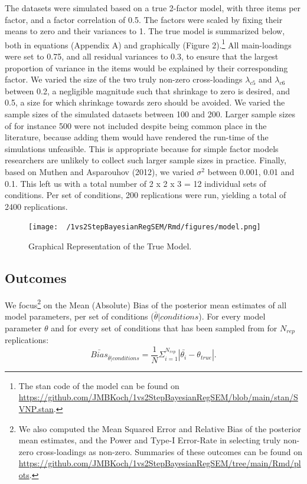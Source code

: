 \documentclass[
  man,floatsintext]{apa6}
\begin{document}
The datasets were simulated based on a true 2-factor model, with three items per factor, and a factor correlation of 0.5. The factors were scaled by fixing their means to zero and their variances to 1. The true model is summarized below, both in equations (Appendix A) and graphically (Figure 2).\footnote{The stan code of the model can be found on \url{https://github.com/JMBKoch/1vs2StepBayesianRegSEM/blob/main/stan/SVNP.stan}.} All main-loadings were set to 0.75, and all residual variances to 0.3, to ensure that the largest proportion of variance in the items would be explained by their corresponding factor. We varied the size of the two truly non-zero cross-loadings \(\lambda_{c 5}\) and \(\lambda_{c 6}\) between 0.2, a negligible magnitude such that shrinkage to zero is desired, and 0.5, a size for which shrinkage towards zero should be avoided. We varied the sample sizes of the simulated datasets between 100 and 200. Larger sample sizes of for instance 500 were not included despite being common place in the literature, because adding them would have rendered the run-time of the simulations unfeasible. This is appropriate because for simple factor models researchers are unlikely to collect such larger sample sizes in practice. Finally, based on Muthen and Asparouhov (2012), we varied \(\sigma^2\) between 0.001, 0.01 and 0.1. This left us with a total number of 2 x 2 x 3 = 12 individual sets of conditions. Per set of conditions, 200 replications were run, yielding a total of 2400 replications.

\begin{figure}
\centering
\texttt{[image: ~/1vs2StepBayesianRegSEM/Rmd/figures/model.png]}
\caption{Graphical Representation of the True Model.}
\end{figure}

\hypertarget{outcomes}{%
\subsection{Outcomes}\label{outcomes}}

We focus\footnote{We also computed the Mean Squared Error and Relative Bias of the posterior mean estimates, and the Power and Type-I Error-Rate in selecting truly non-zero cross-loadings as non-zero. Summaries of these outcomes can be found on \url{https://github.com/JMBKoch/1vs2StepBayesianRegSEM/tree/main/Rmd/plots}.} on the Mean (Absolute) Bias of the posterior mean estimates of all model parameters, per set of conditions (\(\bar{\theta} | conditions\)). For every model parameter \(\theta\) and for every set of conditions that has been sampled from for \(N_{rep}\) replications:
\[\bar{Bias}_{\bar{\theta} | conditions} = \frac{1}{N} \Sigma_{i = 1}^{N_{rep}} |\bar{\theta_i} - \theta_{true}|.\]
\end{document}
